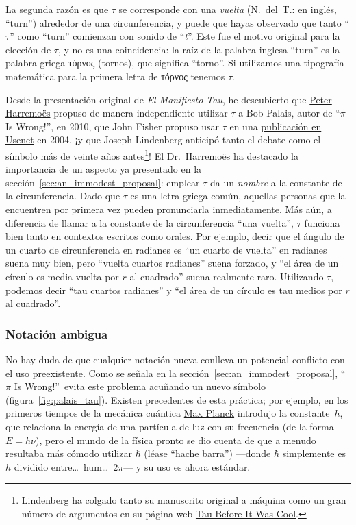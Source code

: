 La segunda razón es que $\tau$ se corresponde con una \emph{vuelta} (N.~del~T.: en inglés, ``turn'') alrededor de una circunferencia, y puede que hayas observado que tanto ``$\tau$'' como ``turn'' comienzan con sonido de ``\emph{t}''. Este fue el motivo original para la elección de $\tau$, y no es una coincidencia: la raíz de la palabra inglesa ``turn'' es la palabra griega τόρνος (tornos), que significa ``torno''. Si utilizamos una tipografía matemática para la primera letra de τόρνος tenemos $\tau$.

Desde la presentación original de \emph{El Manifiesto Tau}, he descubierto que \href{http://www.harremoes.dk/Peter/}{Peter Harremo\"{e}s} propuso de manera independiente utilizar $\tau$ a Bob Palais, autor de ``$\pi$ Is Wrong!'', en 2010, que John Fisher propuso usar $\tau$ en una \href{https://groups.google.com/forum/#!msg/sci.math/c-DHmJHSA0A/sLCoOtHB1UAJ}{publicación en Usenet} en 2004, ¡y que Joseph Lindenberg anticipó tanto el debate como el símbolo más de veinte años antes\footnote{Lindenberg ha colgado tanto su manuscrito original a máquina como un gran número de argumentos en su página web \href{http://sites.google.com/site/taubeforeitwascool/}{Tau Before It Was Cool}.}! El Dr.~Harremo\"{e}s ha destacado la importancia de un aspecto ya presentado en la sección~\ref{sec:an_immodest_proposal}: emplear $\tau$ da un \emph{nombre} a la constante de la circunferencia. Dado que $\tau$ es una letra griega común, aquellas personas que la encuentren por primera vez pueden pronunciarla inmediatamente. Más aún, a diferencia de llamar a la constante de la circunferencia ``una vuelta'', $\tau$ funciona bien tanto en contextos escritos como orales. Por ejemplo, decir que el ángulo de un cuarto de circunferencia en radianes es ``un cuarto de vuelta'' en radianes suena muy bien, pero ``vuelta cuartos radianes'' suena forzado, y ``el área de un círculo es media vuelta por $r$ al cuadrado'' suena realmente raro. Utilizando $\tau$, podemos decir ``tau cuartos radianes'' y ``el área de un círculo es tau medios por $r$ al cuadrado''.

    \subsubsection{Notación ambigua} %
    \label{sec:ambiguous_notation}

No hay duda de que cualquier notación nueva conlleva un potencial conflicto con el uso preexistente. Como se señala en la sección~\ref{sec:an_immodest_proposal}, ``$\pi$ Is Wrong!''\ evita este problema acuñando un nuevo símbolo (figura~\ref{fig:palais_tau}). Existen precedentes de esta práctica; por ejemplo, en los primeros tiempos de la mecánica cuántica \href{https://es.wikipedia.org/wiki/Max_Planck}{Max Planck} introdujo la constante~$h$, que relaciona la energía de una partícula de luz con su frecuencia (de la forma $E = h\nu$), pero el mundo de la física pronto se dio cuenta de que a menudo resultaba más cómodo utilizar $\hbar$ (léase ``hache barra'') ---donde $\hbar$ simplemente es $h$ dividido entre\ldots\ hum\ldots\ $2\pi$--- y su uso es ahora estándar. 

